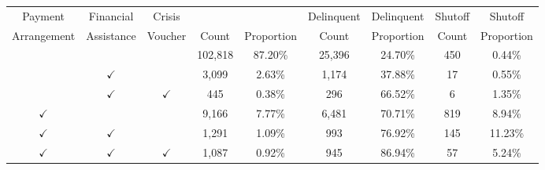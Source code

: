 \begin{tabular}{c|c|c|c|c|c|c|c|c}
\toprule 
\midrule 
Payment & Financial & Crisis &  &  & Delinquent & Delinquent & Shutoff & Shutoff \\
Arrangement & Assistance & Voucher & Count & Proportion & Count & Proportion & Count & Proportion \\
\midrule 
 &  &  & 102,818 & 87.20\% & 25,396 & 24.70\% & 450 & 0.44\% \\
 & $\checkmark$ &  & 3,099 & 2.63\% & 1,174 & 37.88\% & 17 & 0.55\% \\
 & $\checkmark$ & $\checkmark$ & 445 & 0.38\% & 296 & 66.52\% & 6 & 1.35\% \\
$\checkmark$ &  &  & 9,166 & 7.77\% & 6,481 & 70.71\% & 819 & 8.94\% \\
$\checkmark$ & $\checkmark$ &  & 1,291 & 1.09\% & 993 & 76.92\% & 145 & 11.23\% \\
$\checkmark$ & $\checkmark$ & $\checkmark$ & 1,087 & 0.92\% & 945 & 86.94\% & 57 & 5.24\% \\
\midrule 
\bottomrule 
\end{tabular}
